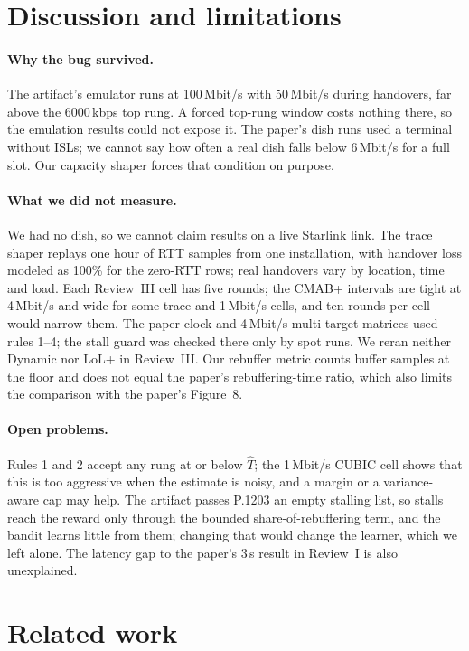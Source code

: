 \documentclass[sigconf]{acmart}
\newcommand{\cmabp}{CMAB+\xspace}
\newcommand{\That}{\hat{T}}
\newcommand{\kbps}{\,kbps\xspace}
\begin{document}
\section{Discussion and limitations}
\label{sec:discussion}

\paragraph{Why the bug survived.} The artifact's emulator runs at 100\,Mbit/s with 50\,Mbit/s during handovers, far above the 6000\kbps top rung. A forced top-rung window costs nothing there, so the emulation results could not expose it. The paper's dish runs used a terminal without ISLs; we cannot say how often a real dish falls below 6\,Mbit/s for a full slot. Our capacity shaper forces that condition on purpose.

\paragraph{What we did not measure.} We had no dish, so we cannot claim results on a live Starlink link. The trace shaper replays one hour of RTT samples from one installation, with handover loss modeled as 100\% for the zero-RTT rows; real handovers vary by location, time and load. Each Review~III cell has five rounds; the \cmabp intervals are tight at 4\,Mbit/s and wide for some trace and 1\,Mbit/s cells, and ten rounds per cell would narrow them. The paper-clock and 4\,Mbit/s multi-target matrices used rules 1--4; the stall guard was checked there only by spot runs. We reran neither Dynamic nor LoL+ in Review~III. Our rebuffer metric counts buffer samples at the floor and does not equal the paper's rebuffering-time ratio, which also limits the comparison with the paper's Figure~8.

\paragraph{Open problems.} Rules 1 and 2 accept any rung at or below $\That$; the 1\,Mbit/s CUBIC cell shows that this is too aggressive when the estimate is noisy, and a margin or a variance-aware cap may help. The artifact passes P.1203 an empty stalling list, so stalls reach the reward only through the bounded share-of-rebuffering term, and the bandit learns little from them; changing that would change the learner, which we left alone. The latency gap to the paper's 3\,s result in Review~I is also unexplained.

\section{Related work}
\label{sec:related}
\end{document}
